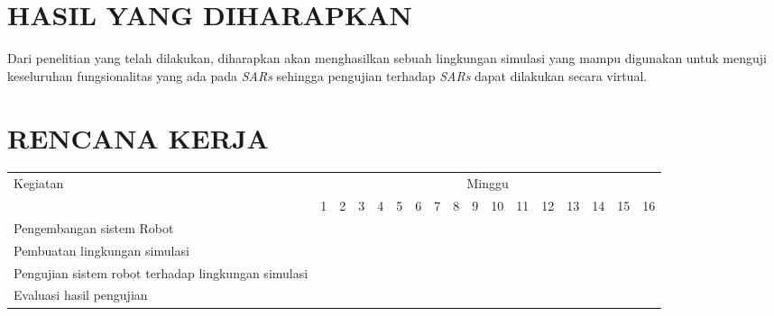 \section{HASIL YANG DIHARAPKAN}

Dari penelitian yang telah dilakukan, diharapkan akan menghasilkan sebuah lingkungan simulasi yang mampu digunakan untuk menguji keseluruhan fungsionalitas yang ada pada \emph{SARs} sehingga pengujian terhadap \emph{SARs} dapat dilakukan secara virtual.

\section{RENCANA KERJA}

\newcommand{\w}{}
\newcommand{\G}{\cellcolor{gray}}
\begin{table}[h!]
  \begin{tabular}{|p{3.5cm}|c|c|c|c|c|c|c|c|c|c|c|c|c|c|c|c|}

    \hline
    \multirow{2}{*}{Kegiatan} & \multicolumn{16}{|c|}{Minggu} \\
    \cline{2-17} &
    1 & 2 & 3 & 4 & 5 & 6 & 7 & 8 & 9 & 10 & 11 & 12 & 13 & 14 & 15 & 16 \\
    \hline

    Pengembangan sistem Robot &
    \G & \G & \G & \G & \G & \G & \w & \w & \w & \w & \w & \w & \w & \w & \w & \w \\
    \hline

    Pembuatan lingkungan simulasi &
    \w & \w & \w & \w & \w & \w & \G & \G & \G & \G & \w & \w & \w & \w & \w & \w \\
    \hline

    Pengujian sistem robot terhadap lingkungan simulasi &
    \w & \w & \w & \w & \w & \w & \w & \w & \w & \w & \G & \G & \G & \G & \w & \w \\
    \hline

    Evaluasi hasil pengujian &
    \w & \w & \w & \w & \w & \w & \w & \w & \w & \w & \w & \w & \w & \w & \G & \G \\
    \hline

  \end{tabular}
\end{table}
